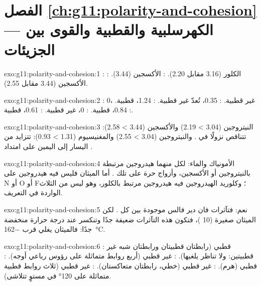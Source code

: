 \section*{الفصل \ref{ch:g11:polarity-and-cohesion} --- الكهرسلبية والقطبية والقوى بين الجزيئات}

\begin{solution}{exo:g11:polarity-and-cohesion:1}
: الكلور (3.16 مقابل 2.20). : الأكسجين (3.44).
: الأكسجين (3.44 مقابل 2.55).
\end{solution}

\begin{solution}{exo:g11:polarity-and-cohesion:2}
: 0، غير قطبية. : 0.35، تُعدّ غير قطبية. :
1.24، قطبية. : 0.84، قطبية. : 0، غير قطبية. :
0.61، قطبية.
\end{solution}

\begin{solution}{exo:g11:polarity-and-cohesion:3}
النيتروجين (3.04 > 2.19) والأكسجين (3.44 > 2.58): تتناقص  نزولًا في
. والنيتروجين (3.04 > 2.55) والمغنيسيوم
(1.31 > 0.93): تتزايد من اليسار إلى اليمين على امتداد .
\end{solution}

\begin{solution}{exo:g11:polarity-and-cohesion:4}
الأمونياك والماء: لكل منهما  هيدروجين مرتبطة بالنيتروجين أو الأكسجين، وأزواج
حرة على تلك . أما الميثان فليس فيه هيدروجين على N أو O أو F؛ وكلوريد
الهيدروجين فيه هيدروجين مرتبط بالكلور، وهو ليس من  الثلاث الواردة في
التعريف.
\end{solution}

\begin{solution}{exo:g11:polarity-and-cohesion:5}
نعم: فتآثرات فان دير فالس موجودة بين كل . لكن  الميثان صغيرة (10
)، فتكون هذه التآثرات ضعيفة جدًا وتنكسر عند درجة حرارة منخفضة جدًا: فالميثان
يغلي قرب
\qty{-162}{\celsius}.
\end{solution}

\begin{solution}{exo:g11:polarity-and-cohesion:6}
: قطبي (رابطتان  قطبيتان ورابطتان  شبه غير
قطبيتين: ولا تناظر يلغيها). : غير قطبي (أربع
روابط متماثلة على رؤوس رباعي أوجه). : قطبي
(هرم). : غير قطبي (خطي، رابطتان متعاكستان). :
غير قطبي (ثلاث روابط قطبية متماثلة على \ang{120} في مستوٍ تتلاشى).
\end{solution}

